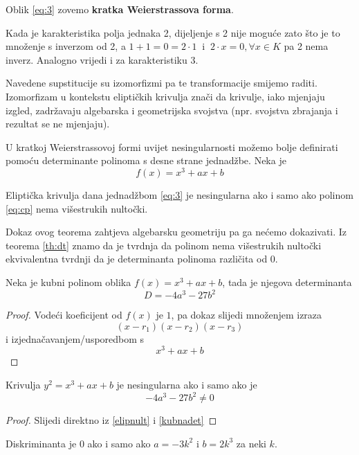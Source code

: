 \documentclass{mathos}
\begin{document}
Oblik \ref{eq:3} zovemo \textbf{kratka Weierstrassova forma}.

\begin{nap}
    Kada je karakteristika polja jednaka 2, dijeljenje s 2 nije moguće zato što je to množenje s inverzom od 2, a $1 + 1 = 0 = 2 \cdot 1 \ $ i $ \ 2\cdot x = 0, \forall x \in K$ pa 2 nema inverz.
    Analogno vrijedi i za karakteristiku 3.
\end{nap}
\begin{nap}
    Navedene supstitucije su izomorfizmi pa te transformacije smijemo raditi. Izomorfizam u kontekstu eliptičkih krivulja znači da krivulje, iako mjenjaju izgled, zadržavaju algebarska i geometrijska svojstva (npr. svojstva zbrajanja i rezultat se ne mjenjaju).
\end{nap}

U kratkoj Weierstrassovoj formi uvijet nesingularnosti možemo bolje definirati pomoću determinante polinoma s desne strane jednadžbe. Neka je
\begin{equation}
    \label{eq:cp}
    f(x) = x^3 + ax + b 
\end{equation}
\begin{theorem}
    \label{elipnult}
    Eliptička krivulja dana jednadžbom \ref{eq:3} je nesingularna ako i samo ako polinom \ref{eq:cp} nema višestrukih nultočki.
\end{theorem}
Dokaz ovog teorema zahtjeva algebarsku geometriju pa ga nećemo dokazivati. Iz teorema \ref{th:dt} znamo da je tvrdnja da polinom nema višestrukih nultočki ekvivalentna tvrdnji da je determinanta polinoma različita od $0$.
\begin{propozicija}
    \label{kubnadet}
    Neka je kubni polinom oblika $f(x) = x^3 + ax + b$, tada je njegova determinanta
    \[ D = -4a^3 - 27b^2 \]
\end{propozicija}
\begin{proof}
    Vodeći koeficijent od $f(x)$ je $1$, pa dokaz slijedi množenjem izraza \[(x - r_1)(x - r_2)(x - r_3)\] i izjednačavanjem/usporedbom s \[x^3 + ax + b\]
\end{proof}
\begin{korolar}
    Krivulja $y^2 = x^3 + ax + b$ je nesingularna ako i samo ako je
    \[ -4a^3 - 27b^2 \neq 0 \]
\end{korolar}
\begin{proof}
    Slijedi direktno iz \ref{elipnult} i \ref{kubnadet}
\end{proof}
\begin{nap}
    Diskriminanta je $0$ ako i samo ako $a = -3k^2$ i $b=2k^3$ za neki $k$.
\end{nap}
\end{document}
